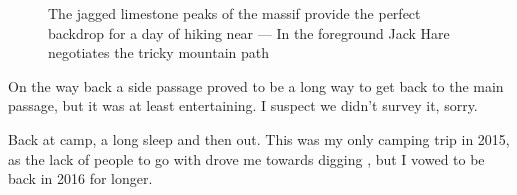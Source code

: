 \begin{figure}[t!]
\checkoddpage \ifoddpage \forcerectofloat \else \forceversofloat \fi
\centering
{}
\caption{The jagged limestone peaks of the  massif provide the perfect backdrop for a day of hiking near  --- In the foreground Jack Hare negotiates the tricky mountain path }
\label{kukjack}
\end{figure}

On the way back a side passage proved to be a long way to get back to the main passage, but it was at least entertaining. I suspect we didn't survey it, sorry.

Back at camp, a long sleep and then out. This was my only camping trip in 2015, as the lack of people to go with drove me towards digging , but I vowed to be back in 2016 for longer. 


